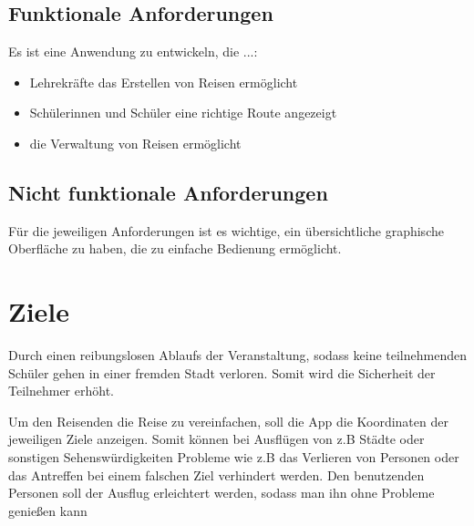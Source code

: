 \subsection{Funktionale Anforderungen}

Es ist eine Anwendung zu entwickeln, die ...:

\begin{itemize}
    \item Lehrekräfte das Erstellen von Reisen ermöglicht
    \item Schülerinnen und Schüler eine richtige Route angezeigt
    \item die Verwaltung von Reisen ermöglicht
\end{itemize}


\subsection{Nicht funktionale Anforderungen}

Für die jeweiligen Anforderungen ist es wichtige, ein übersichtliche graphische Oberfläche zu haben, die zu einfache Bedienung ermöglicht.

\section{Ziele}

Durch einen reibungslosen Ablaufs der Veranstaltung, sodass keine teilnehmenden Schüler gehen in einer fremden Stadt verloren. Somit wird die Sicherheit der Teilnehmer erhöht.

Um den Reisenden die Reise zu vereinfachen, soll die App die Koordinaten der jeweiligen Ziele anzeigen. Somit können bei Ausflügen von z.B Städte oder sonstigen Sehenswürdigkeiten Probleme wie z.B das Verlieren von Personen oder das Antreffen bei einem falschen Ziel verhindert werden. Den benutzenden Personen soll der Ausflug erleichtert werden, sodass man ihn ohne Probleme genießen kann